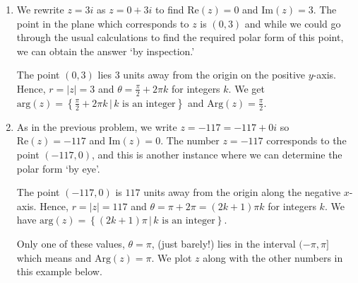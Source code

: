 \documentclass{ximera}
\begin{document}
\begin{example}
\begin{explanation}
\begin{enumerate}
  
 
We find $\theta = \pi + \arctan(-2) + 2\pi k$, or, more succinctly  $\theta = \pi - \arctan(2) + 2\pi k$ for integers $k$.  Hence $\text{arg}(z) = \left\{\pi - \arctan(2) + 2\pi k \, | \, \text{$k$ is an integer}\right\}$.  Only  $\theta = \pi - \arctan(2)$ satisfies $-\pi < \theta \leq \pi$,  so we get $\text{Arg}(z) = \pi - \arctan(2)$. 

\item    We rewrite $z = 3i$ as $z = 0+3i$ to find $\text{Re}(z) = 0$ and $\text{Im}(z) = 3$.  The point in the plane which corresponds to $z$ is $(0,3)$ and while we could go through the usual calculations to find the required polar form of this point, we can obtain the answer `by inspection.'

 

  The point  $(0,3)$ lies $3$ units away from the origin on the positive $y$-axis.  Hence, $r=|z|=3$ and $\theta = \frac{\pi}{2} + 2\pi k$ for integers $k$. We get $\text{arg}(z) = \left\{ \frac{\pi}{2} + 2\pi k \, | \, \text{$k$ is an integer} \right\}$ and $\text{Arg}(z) = \frac{\pi}{2}$. 

\item As in the previous problem, we write $z = -117 = -117 + 0i$ so $\text{Re}(z) = -117$ and $\text{Im}(z) = 0$. The number $z = -117$ corresponds to the point $(-117,0)$, and this is another instance where  we can determine the polar form `by eye'.  

 

The point $(-117,0)$ is $117$ units away from the origin along the negative $x$-axis.  Hence, $r=|z|=117$ and $\theta = \pi + 2\pi  = (2k+1)\pi k$ for integers $k$. We have  $\text{arg}(z) = \left\{ (2k+1)\pi \, | \, k \text{ is an  integer} \right\}$.  

 

Only one of these values, $\theta = \pi$, (just barely!) lies in the interval $(-\pi, \pi]$ which means and $\text{Arg}(z) =\pi$. We plot $z$ along with the other numbers in this example below.


\begin{image}
\end{image}
\end{enumerate}
\end{explanation}
\end{example}
\end{document}
